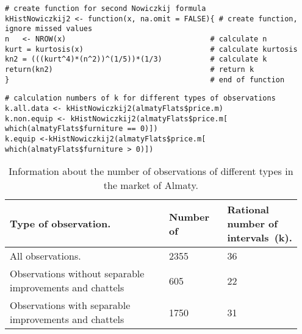 \documentclass[]{scrreprt}
\begin{document}
%
\begin{lstlisting}[float=htp, caption = Create a function to calculate~k using Nowiczkij's formula, firstnumber=1, label= lst:k-number-Nowiczkij-R]
# create function for second Nowiczkij formula
kHistNowiczkij2 <- function(x, na.omit = FALSE){ # create function, ignore missed values
n   <- NROW(x)                                 # calculate n
kurt = kurtosis(x)                             # calculate kurtosis
kn2 = (((kurt^4)*(n^2))^(1/5))*(1/3)           # calculate k
return(kn2)                                    # return k  
}                                              # end of function
\end{lstlisting} 
%
\begin{lstlisting}[float=htp, caption = Calculation of~k for observations of different types by Nowiczkij's formula., firstnumber=1, label= lst:k-number-R]
# calculation numbers of k for different types of observations
k.all.data <- kHistNowiczkij2(almatyFlats$price.m)
k.non.equip <- kHistNowiczkij2(almatyFlats$price.m[ which(almatyFlats$furniture == 0)])
k.equip <-kHistNowiczkij2(almatyFlats$price.m[ which(almatyFlats$furniture > 0)])                                       
\end{lstlisting}
%
\begin{table}[htp]
	\caption{Information about the number of observations of different types in the market of Almaty.}\label{tab:numbers-of-observations-almaty-R}
	\centering
	\begin{tabularx}{\textwidth}{p{0.55\linewidth} p{0.2\linewidth} p{0.2\linewidth}}
		\hline
		Type of observation.&Number of&Rational number of intervals~(k).\\
		\hline
		All observations.&2355&36\\
		\hline
		Observations without separable improvements and chattels&605&22\\
		\hline
		Observations with separable improvements and chattels&1750&31\\
		\hline
	\end{tabularx}
\end{table}
%
\end{document}
